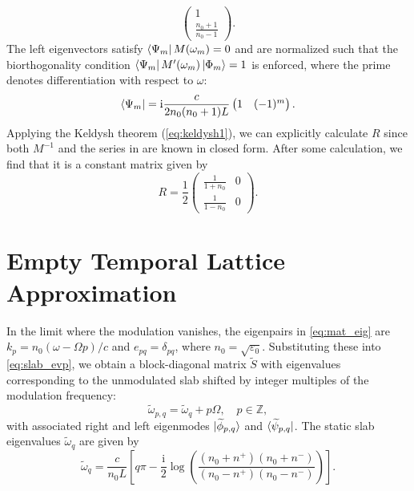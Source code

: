 \documentclass[%
 reprint,
 amsmath,amssymb,
 aps,
 prb,
]{revtex4-2}
\begin{document}
\begin{appendix}
\begin{equation}
\begin{pmatrix}
1 \\
\frac{n_0+1}{n_0-1}
\end{pmatrix}.
\end{equation}
The left eigenvectors satisfy $\bra{\Psi_m} M(\omega_m) = 0$ and are normalized such that the biorthogonality condition $\bra{\Psi_m}M'(\omega_m) \ket{\Phi_m} = 1$ is enforced, where the prime denotes differentiation with respect to $\omega$:
\begin{equation}
\bra{\Psi_m} = \mathrm{i} \frac{c}{2 n_0 (n_0+1) L}
\begin{pmatrix}
1 & (-1)^m
\end{pmatrix}.
\end{equation}
Applying the Keldysh theorem (\ref{eq:keldysh1}), we can explicitly calculate $R$ since both $M^{-1}$ and the series in are known in closed form. After some calculation, we find that it is a constant matrix given by
\begin{equation}
R = \frac{1}{2}
\begin{pmatrix}
\frac{1}{1+n_0} & 0 \\
\frac{1}{1-n_0} & 0
\end{pmatrix}.
\end{equation}


\section{Empty Temporal Lattice Approximation}
\label{sec:empty}

In the limit where the modulation vanishes, the eigenpairs in \eqref{eq:mat_eig} are $k_p = n_0 (\omega-\Omega p)/c$ and $e_{pq} = \delta_{pq}$, where $n_0=\sqrt{\varepsilon_0}$. Substituting these into \eqref{eq:slab_evp}, we obtain a block-diagonal matrix $\widetilde{S}$ with eigenvalues corresponding to the unmodulated slab shifted by integer multiples of the modulation frequency:
\begin{equation}
\widetilde{\omega}_{p,q} = \widetilde{\omega}_q + p\Omega, \quad p \in \mathbb{Z},
\end{equation}
with associated right and left eigenmodes $\ket{\widetilde{\phi}_{p,q}}$ and $\bra{\widetilde{\psi}_{p,q}}$. The static slab eigenvalues $\widetilde{\omega}_q$ are given by
\begin{equation}
\widetilde{\omega}_q = \frac{c}{n_0 L} \left[q\pi - \frac{\mathrm{i}}{2} \log\left(\frac{(n_0+n^+)(n_0+n^-)}{(n_0-n^+)(n_0-n^-)}\right)\right].
\label{eq:evs_slab_static1}
\end{equation}


\end{appendix}
\end{document}
